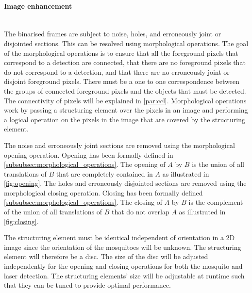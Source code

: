\paragraph{Image enhancement}\mbox{}\\
The binarised frames are subject to noise, holes, and erroneously joint or disjointed sections. This can be resolved using morphological operations.
The goal of the morphological operations is to ensure that all the foreground pixels that correspond to a detection are connected, that there are no foreground pixels that do not correspond to a detection, and that there are no erroneously joint or disjoint foreground pixels. There must be a one to one correspondence between the groups of connected foreground pixels and the objects that must be detected. The connectivity of pixels will be explained in \autoref{par:ccl}. Morphological operations work by passing a structuring element over the pixels in an image and performing a logical operation on the pixels in the image that are covered by the structuring element.

The noise and erroneously joint sections are removed using the morphological opening operation. Opening has been formally defined in \autoref{subsubsec:morphological_operations}. The opening of $A$ by $B$ is the union of all translations of $B$ that are completely contained in $A$ as illustrated in \autoref{fig:opening}. The holes and erroneously disjointed sections are removed using the morphological closing operation. Closing has been formally defined \autoref{subsubsec:morphological_operations}. The closing of $A$ by $B$ is the complement of the union of all translations of $B$ that do not overlap $A$ as illustrated in \autoref{fig:closing}.

The structuring element must be identical independent of orientation in a 2D image since the orientation of the mosquitoes will be unknown. The structuring element will therefore be a disc. The size of the disc will be adjusted independently for the opening and closing operations for both the mosquito and laser detection. The structuring elements' size will be adjustable at runtime such that they can be tuned to provide optimal performance.


